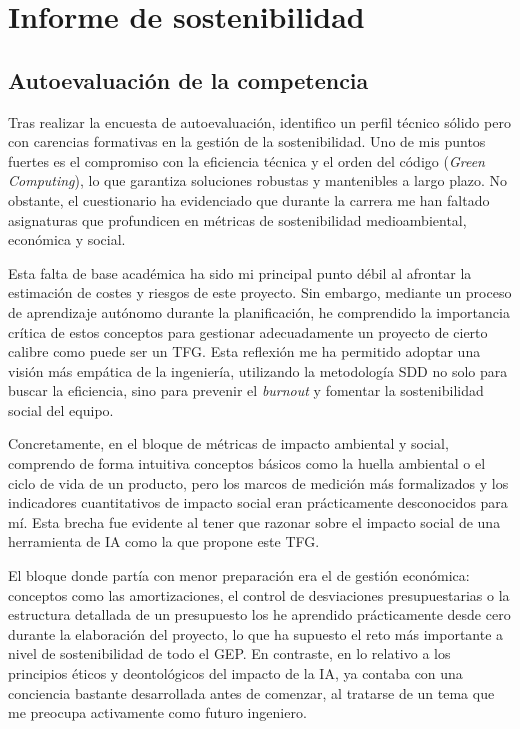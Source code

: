 \documentclass[11pt, letterpaper]{article}
\begin{document}
\section{Informe de sostenibilidad}

\subsection{Autoevaluación de la competencia}
Tras realizar la encuesta de autoevaluación, identifico un perfil técnico sólido pero con carencias formativas en la gestión de la sostenibilidad. Uno de mis puntos fuertes es el compromiso con la eficiencia técnica y el orden del código (\textit{Green Computing}), lo que garantiza soluciones robustas y mantenibles a largo plazo. No obstante, el cuestionario ha evidenciado que durante la carrera me han faltado asignaturas que profundicen en métricas de sostenibilidad medioambiental, económica y social.

Esta falta de base académica ha sido mi principal punto débil al afrontar la estimación de costes y riesgos de este proyecto. Sin embargo, mediante un proceso de aprendizaje autónomo durante la planificación, he comprendido la importancia crítica de estos conceptos para gestionar adecuadamente un proyecto de cierto calibre como puede ser un TFG. Esta reflexión me ha permitido adoptar una visión más empática de la ingeniería, utilizando la metodología SDD no solo para buscar la eficiencia, sino para prevenir el \textit{burnout} y fomentar la sostenibilidad social del equipo.

Concretamente, en el bloque de métricas de impacto ambiental y social, comprendo de forma intuitiva conceptos básicos como la huella ambiental o el ciclo de vida de un producto, pero los marcos de medición más formalizados y los indicadores cuantitativos de impacto social eran prácticamente desconocidos para mí. Esta brecha fue evidente al tener que razonar sobre el impacto social de una herramienta de IA como la que propone este TFG.

El bloque donde partía con menor preparación era el de gestión económica: conceptos como las amortizaciones, el control de desviaciones presupuestarias o la estructura detallada de un presupuesto los he aprendido prácticamente desde cero durante la elaboración del proyecto, lo que ha supuesto el reto más importante a nivel de sostenibilidad de todo el GEP. En contraste, en lo relativo a los principios éticos y deontológicos del impacto de la IA, ya contaba con una conciencia bastante desarrollada antes de comenzar, al tratarse de un tema que me preocupa activamente como futuro ingeniero.
\end{document}
